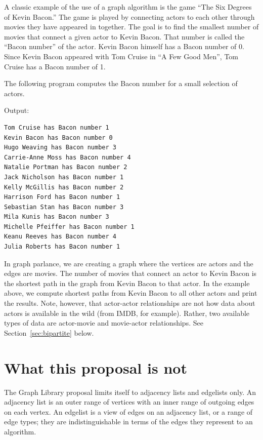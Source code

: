 A classic example of the use of a graph algorithm is the game ``The Six Degrees of Kevin Bacon.''
The game is played by connecting actors to each other through movies they have appeared in together.
The goal is to find the smallest number of movies that connect a given actor to Kevin Bacon.
That number is called the ``Bacon number'' of the actor. Kevin Bacon himself has a Bacon number of 0.
Since Kevin Bacon appeared with Tom Cruise in ``A Few Good Men'', Tom Cruise has a Bacon number of 1.

The following program computes the Bacon number for a small selection of actors.

{\small
  
}


\noindent
Output:
\begin{lstlisting}
Tom Cruise has Bacon number 1
Kevin Bacon has Bacon number 0
Hugo Weaving has Bacon number 3
Carrie-Anne Moss has Bacon number 4
Natalie Portman has Bacon number 2
Jack Nicholson has Bacon number 1
Kelly McGillis has Bacon number 2
Harrison Ford has Bacon number 1
Sebastian Stan has Bacon number 3
Mila Kunis has Bacon number 3
Michelle Pfeiffer has Bacon number 1
Keanu Reeves has Bacon number 4
Julia Roberts has Bacon number 1    
\end{lstlisting}  


In graph parlance, we are creating a graph where the vertices are actors and the edges are movies.
The number of movies that connect an actor to Kevin Bacon is the shortest path in the graph
from Kevin Bacon to that actor. In the example above, we compute shortest paths from Kevin
Bacon to all other actors and print the results.
Note, however, that actor-actor relationships are not how data about actors
is available in the wild (from IMDB, for example).  Rather, two available types of data are actor-movie and movie-actor relationships.  See Section~\ref{sec:bipartite} below.

\section{What this proposal is  \textbf{not}}

The Graph Library proposal limits itself to adjacency lists and edgelists only. An adjacency list is an outer range of vertices with an inner range of outgoing
edges on each vertex. An edgelist is a view of edges on an adjacency list, or a range of edge types; they are indistinguishable in terms of the edges they represent
to an algorithm.

